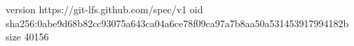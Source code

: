 version https://git-lfs.github.com/spec/v1
oid sha256:0abe9d68b82cc93075a643ca04a6ce78f09ca97a7b8aa50a531453917994182b
size 40156
